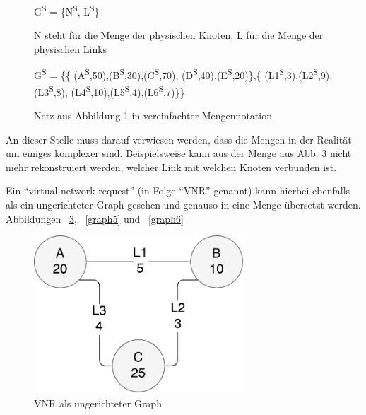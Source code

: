\documentclass{lni}
\begin{document}
\begin{figure}[htb]
\begin{center}
G\textsuperscript{S} = \{N\textsuperscript{S}, L\textsuperscript{S}\}
\caption{\label{graph2}N steht für die Menge der physischen Knoten, L für die Menge der physischen Links}
\end{center}
\end{figure}

\begin{figure}[htb]
\begin{center}
\hspace{1.0cm}
G\textsuperscript{S} = \{\{
(A\textsuperscript{S},50),(B\textsuperscript{S},30),(C\textsuperscript{S},70),
(D\textsuperscript{S},40),(E\textsuperscript{S},20)\},\newline\{
(L1\textsuperscript{S},3),(L2\textsuperscript{S},9),(L3\textsuperscript{S},8),
(L4\textsuperscript{S},10),(L5\textsuperscript{S},4),(L6\textsuperscript{S},7)\}\}
\caption{\label{graph3} Netz aus Abbildung 1 in vereinfachter Mengennotation}
\end{center}
\end{figure}

An dieser Stelle muss darauf verwiesen werden, dass die Mengen in der Realität um einiges komplexer sind. Beispielsweise kann aus der Menge aus Abb. 3 nicht mehr rekonstruiert werden, welcher Link mit welchen Knoten verbunden ist.
\newpage



Ein "`virtual network request"' (in Folge "`VNR"' genannt) kann hierbei ebenfalls als ein ungerichteter Graph gesehen und genauso in eine Menge übersetzt werden. Abbildungen ~\ref{graph4}, ~\ref{graph5} und ~\ref{graph6}

\begin{figure}[htb]
\begin{center}
\hspace{0.8cm}
\includegraphics[width=0.7\textwidth]{VNR1.pdf}\newline
\caption{\label{graph4}VNR als ungerichteter Graph}
\end{center}
\end{figure}
\end{document}
